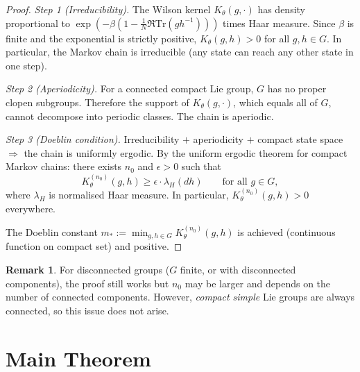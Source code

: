 \documentclass[12pt]{article}
\theoremstyle{plain}
\theoremstyle{definition}
\newtheorem{remark}[theorem]{Remark}
\numberwithin{equation}{section}
\begin{document}
\begin{proof}
\emph{Step 1 (Irreducibility).}
The Wilson kernel $K_\theta(g,\cdot)$ has density proportional to $\exp(-\beta(1-\frac{1}{N}\Re\mathrm{Tr}(gh^{-1})))$ times Haar measure.  Since $\beta$ is finite and the exponential is strictly positive, $K_\theta(g,h)>0$ for all $g,h\in G$.  In particular, the Markov chain is irreducible (any state can reach any other state in one step).

\emph{Step 2 (Aperiodicity).}
For a connected compact Lie group, $G$ has no proper clopen subgroups.  Therefore the support of $K_\theta(g,\cdot)$, which equals all of $G$, cannot decompose into periodic classes.  The chain is aperiodic.

\emph{Step 3 (Doeblin condition).}
Irreducibility $+$ aperiodicity $+$ compact state space $\Rightarrow$ the chain is uniformly ergodic.  By the uniform ergodic theorem for compact Markov chains: there exists $n_0$ and $\epsilon>0$ such that
\begin{equation}
K_\theta^{(n_0)}(g,h) \geq \epsilon\cdot\lambda_H(dh)\qquad\text{for all }g\in G,
\end{equation}
where $\lambda_H$ is normalised Haar measure.  In particular, $K_\theta^{(n_0)}(g,h)>0$ everywhere.

The Doeblin constant $m_*:=\min_{g,h\in G}K_\theta^{(n_0)}(g,h)$ is achieved (continuous function on compact set) and positive.
\end{proof}

\begin{remark}
For disconnected groups ($G$ finite, or with disconnected components), the proof still works but $n_0$ may be larger and depends on the number of connected components.  However, \emph{compact simple} Lie groups are always connected, so this issue does not arise.
\end{remark}



\section*{Main Theorem}
\end{document}

